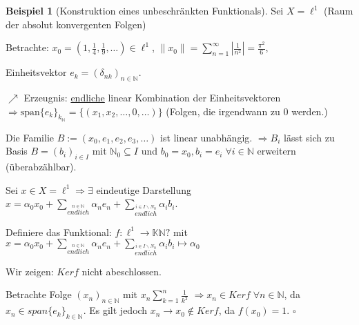 \documentclass[ngerman]{report}
\theoremstyle{plain}%
\theoremstyle{definition}%
\newtheorem{bsp}[thm]{Beispiel}
\theoremstyle{myStyle}
\newcommand{\N}{\mathbb{N}}
\newcommand{\K}{\mathbb{K}}
\newcommand{\norm}[1]{\|#1\|}
\newcommand{\df}[1][]{%
	\overset{#1}{\Rightarrow}
}
\begin{document}
	\begin{bsp}[Konstruktion eines unbeschränkten Funktionals]
		Sei $X= \ell^1$ ({Raum der absolut konvergenten Folgen})\par
		Betrachte: $x_0 = (1, \frac{1}{4}, \frac{1}{9},\dots) \in \ell^1$, 
		$\norm{x_0} = \sum_{n=1}^\infty |\frac{1}{n^2}| = \frac{\pi^2}{6} $,\par
		Einheitsvektor $e_k = (\delta_{nk})_{n\in\N}$.\par 
		$\nearrow$ Erzeugnis: \underline{endliche} linear Kombination der Einheitsvektoren 
		$\df \text{span} \{e_k\}_{k_\N} = \{(x_1,x_2,\dots,0,\dots)\}$ (Folgen, die irgendwann zu $0$ werden.)\par
		Die Familie $B := (x_0,e_1,e_2,e_3,\dots)$ ist linear unabhängig.
		$\df B_i$ lässt sich zu Basis $B = (b_i)_{i\in I}$ mit $\N_0 \subseteq I$ und $b_0 = x_0, b_i = e_i \; \forall i\in \N$ erweitern (überabzählbar).\par
		Sei $x\in X= \ell^1 \df \exists$ eindeutige Darstellung 
		$x = \alpha_0 x_0 +\sum_{\overset{n\in\N}{endlich}} \alpha_n e_n + \sum_{\overset{i\in I\backslash N_0}{endlich}}\alpha_i b_i$. \par
		Definiere das Funktional: $f: \ell^1 \to \K \N?$ mit $x = \alpha_0 x_0 +\sum_{\overset{n\in\N}{endlich}} \alpha_n e_n + \sum_{\overset{i\in I\backslash N_0}{endlich}}\alpha_i b_i \mapsto \alpha_0$\par
	Wir zeigen: $Ker f$ nicht abeschlossen.\par
		Betrachte Folge $(x_n)_{n\in\N}$ mit $x_n \sum_{k=1}^n \frac{1}{k^2}$		 
		$\df x_n\in Ker f \; \forall n\in\N$, da $x_n\in span\{e_k\}_{k\in\N}$. 
		Es gilt jedoch $x_n \to x_0 \not\in Ker f$, da $f(x_0) = 1$. \hfill $\square$ 
	\end{bsp}
\end{document}
